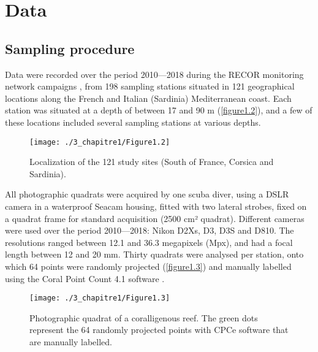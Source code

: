 \section{Data}\label{chapitre1_3}

\subsection{Sampling procedure}\label{chapitre1_3.1}
Data were recorded over the period 2010---2018 during the RECOR monitoring network campaigns \citep{andromede-oceanologie_recor_2018}, from 198 sampling stations situated in 121 geographical locations along the French and Italian (Sardinia) Mediterranean coast. Each station was situated at a depth of between 17 and 90 m (\autoref{figure1.2}), and a few of these locations included several sampling stations at various depths. 

\begin{figure}[H]
	\begin{center}
	\texttt{[image: ./3\_chapitre1/Figure1.2]}
		\caption{Localization of the 121 study sites (South of France, Corsica and Sardinia).}
	\label{figure1.2}
\end{center}
\end{figure}

All photographic quadrats were acquired by one scuba diver, using a DSLR camera in a waterproof Seacam housing, fitted with two lateral strobes, fixed on a quadrat frame for standard acquisition (2500 cm² quadrat). Different cameras were used over the period 2010---2018: Nikon D2Xs, D3, D3S and D810. The resolutions ranged between 12.1 and 36.3 megapixels (Mpx), and had a focal length between 12 and 20 mm. Thirty quadrats were analysed per station, onto which 64 points were randomly projected (\autoref{figure1.3}) and manually labelled using the Coral Point Count 4.1 \citep{cpce_coral_2011} software \citep{deter_rapid_2012}. 

\begin{figure}[H]
	\begin{center}
	\texttt{[image: ./3\_chapitre1/Figure1.3]}
		\caption[Photographic quadrat of a coralligenous reef]{Photographic quadrat of a coralligenous reef. The green dots represent the 64 randomly projected points with CPCe software that are manually labelled.}
	\label{figure1.3}
\end{center}
\end{figure}

